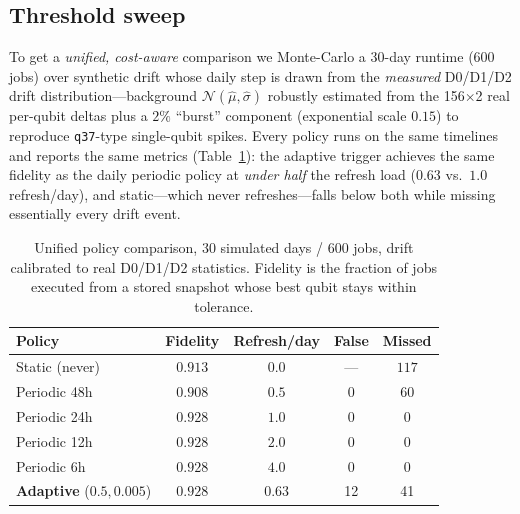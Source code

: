 \documentclass[journal,10pt,twocolumn]{IEEEtran}
\newcommand{\q}[1]{\texttt{q#1}}
\begin{document}
\subsection{Threshold sweep}
\label{sec:sweep}
To get a \emph{unified, cost-aware} comparison we Monte-Carlo a 30-day runtime (600 jobs) over synthetic drift
whose daily step is drawn from the \emph{measured} D0/D1/D2 drift distribution---background
$\mathcal{N}(\widehat{\mu},\widehat{\sigma})$ robustly estimated from the 156$\times$2 real per-qubit deltas plus a
$2\%$ ``burst'' component (exponential scale $0.15$) to reproduce \q{37}-type single-qubit spikes. Every policy
runs on the same timelines and reports the same metrics (Table~\ref{tab:policy}): the adaptive trigger achieves the
same fidelity as the daily periodic policy at \emph{under half} the refresh load ($0.63$ vs.\ $1.0$ refresh/day),
and static---which never refreshes---falls below both while missing essentially every drift event.

\begin{table}[t]
\caption{Unified policy comparison, 30 simulated days / 600 jobs, drift calibrated to real D0/D1/D2 statistics.
Fidelity is the fraction of jobs executed from a stored snapshot whose best qubit stays within tolerance.}
\label{tab:policy}
\centering
\footnotesize
\setlength{\tabcolsep}{3pt}
\begin{tabular}{@{}lcccc@{}}
\toprule
Policy & Fidelity & Refresh/day & False & Missed\\
\midrule
Static (never) & $0.913$ & $0.0$ & --- & $117$\\
Periodic 48h & $0.908$ & $0.5$ & 0 & $60$\\
Periodic 24h & $0.928$ & $1.0$ & 0 & 0\\
Periodic 12h & $0.928$ & $2.0$ & 0 & 0\\
Periodic 6h & $0.928$ & $4.0$ & 0 & 0\\
\textbf{Adaptive} ($0.5,0.005$) & \textbf{$0.928$} & \textbf{$0.63$} & 12 & 41\\
\bottomrule
\end{tabular}
\end{table}
\end{document}
